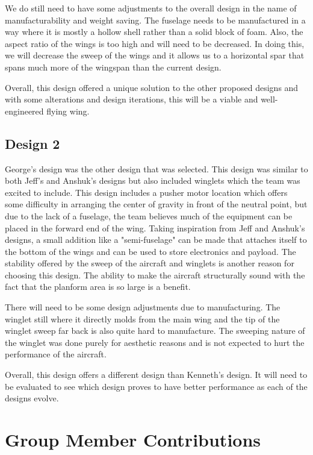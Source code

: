        We do still need to have some adjustments to the overall design in the name of manufacturability and weight saving. The fuselage needs to be manufactured in a way where it is mostly a hollow shell rather than a solid block of foam. Also, the aspect ratio of the wings is too high and will need to be decreased. In doing this, we will decrease the sweep of the wings and it allows us to a horizontal spar that spans much more of the wingspan than the current design. 
    
        Overall, this design offered a unique solution to the other proposed designs and with some alterations and design iterations, this will be a viable and well-engineered flying wing.
    
    \subsection{Design 2}
    
        George's design was the other design that was selected. This design was similar to both Jeff's and Anshuk's designs but also included winglets which the team was excited to include. This design includes a pusher motor location which offers some difficulty in arranging the center of gravity in front of the neutral point, but due to the lack of a fuselage, the team believes much of the equipment can be placed in the forward end of the wing. Taking inspiration from Jeff and Anshuk's designs, a small addition like a "semi-fuselage" can be made that attaches itself to the bottom of the wings and can be used to store electronics and payload. The stability offered by the sweep of the aircraft and winglets is another reason for choosing this design. The ability to make the aircraft structurally sound with the fact that the planform area is so large is a benefit.
    
        There will need to be some design adjustments due to manufacturing. The winglet still where it directly molds from the main wing and the tip of the winglet sweep far back is also quite hard to manufacture. The sweeping nature of the winglet was done purely for aesthetic reasons and is not expected to hurt the performance of the aircraft. 
    
        Overall, this design offers a different design than Kenneth's design. It will need to be evaluated to see which design proves to have better performance as each of the designs evolve.

\section{Group Member Contributions}

